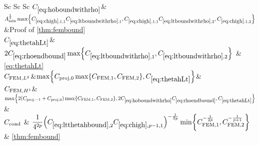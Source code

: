 {\begin{landscape}
\begin{longtabu}{Sc Sc Sc}
  $\CHobound$&$\Amin^{\half}\max\set{\Chighfn{1,1}\CLtboundo,\Chighfn{1,1}\CLtboundt,\Chighfn{1,2}}$&Proof of \cref{thm:fembound}\\
      $\CthetahLt$& $2\Crhoendbound \max\set{\CLtboundo,\CLtboundt} $ & \cref{eq:thetahLt}\\
  $C_{\mathrm{FEM},L^{2}}$&$\max\set{\Cmmofn{0}\max\set{\CFEMo,\CFEMt},\CthetahLt}$&\\
$C_{\mathrm{FEM},H^{1}}$&$\max\set{2\mleft(\Cmmofn{-1}+\Cmmofn{0}\mright)\max\set{\CFEMo,\CFEMt},2\CHobound\Crhoendbound,\CthetahLt} $&\\
    $C_{\mathrm{cond}}$ & $\displaystyle\frac1{4^{2p}} \mleft(\Csecond\Chighfn{p-1,1}\mright)^{-\frac1{2p}} \min\set{\CFEMo^{-\frac1{2p}},\CFEMt^{-\frac1{p+1}}}$ & \cref{thm:fembound}\\
\bottomrule
\end{longtabu}
\end{landscape}
}
